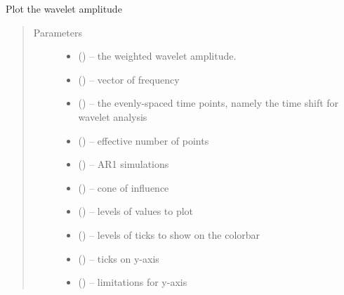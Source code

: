 \documentclass[letterpaper,10pt,english]{sphinxmanual}
\begin{document}
\begin{fulllineitems}
\label{\detokenize{Spectral:pyleoclim.Spectral.plot_wwa}}
Plot the wavelet amplitude
\begin{quote}\begin{description}
\item[{Parameters}] \leavevmode\begin{itemize}
\item {} 
 () -- the weighted wavelet amplitude.

\item {} 
 () -- vector of frequency

\item {} 
 () -- the evenly-spaced time points, namely the time shift for wavelet analysis

\item {} 
 () -- effective number of points

\item {} 
 () -- AR1 simulations

\item {} 
 () -- cone of influence

\item {} 
 () -- levels of values to plot

\item {} 
 () -- levels of ticks to show on the colorbar

\item {} 
 () -- ticks on y-axis

\item {} 
 () -- limitations for y-axis


\end{itemize}
\end{description}
\end{quote}
\end{fulllineitems}
\end{document}
